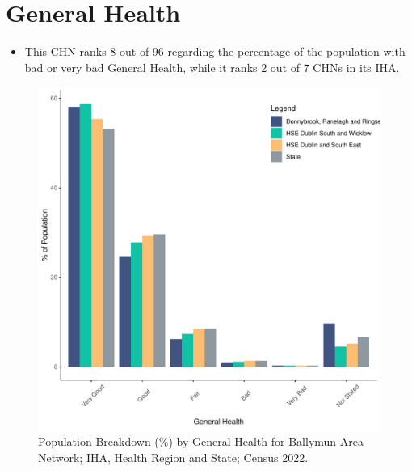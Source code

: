 \documentclass{article}
\begin{document}
\pagebreak

\section{General Health}\label{sect:GenHealth}
\begin{itemize}
\item  This CHN ranks  8 out of 96 regarding the percentage of the population with bad or very bad General Health, while it ranks   2 out of 7 CHNs in its IHA.
\end{itemize}
\begin{figure}[h]
	\centering
	\includegraphics[width = 150mm]{../figures/GenED.pdf}
	\caption{Population Breakdown (\%) by General Health for Ballymun Area Network; IHA, Health Region and State;  Census 2022.}
	\label{fig:2ae19629-1a6a-13a3-e055-000000000001}
	\end{figure}
\end{document}
